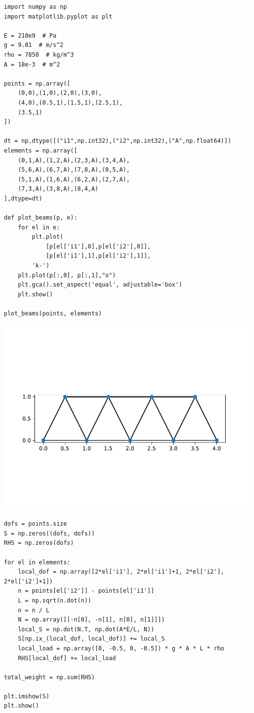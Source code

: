 \begin{verbatim}
import numpy as np
import matplotlib.pyplot as plt

E = 210e9  # Pa
g = 9.81  # m/s^2
rho = 7850  # kg/m^3
A = 18e-3  # m^2

points = np.array([
    (0,0),(1,0),(2,0),(3,0),
    (4,0),(0.5,1),(1.5,1),(2.5,1),
    (3.5,1)
])

dt = np.dtype([("i1",np.int32),("i2",np.int32),("A",np.float64)])
elements = np.array([
    (0,1,A),(1,2,A),(2,3,A),(3,4,A),
    (5,6,A),(6,7,A),(7,8,A),(0,5,A),
    (5,1,A),(1,6,A),(6,2,A),(2,7,A),
    (7,3,A),(3,8,A),(8,4,A)
],dtype=dt)

def plot_beams(p, e):
    for el in e:
        plt.plot(
            [p[el['i1'],0],p[el['i2'],0]],
            [p[el['i1'],1],p[el['i2'],1]],
        'k-')
    plt.plot(p[:,0], p[:,1],"o")
    plt.gca().set_aspect('equal', adjustable='box')
    plt.show()

plot_beams(points, elements)
\end{verbatim}

\includegraphics{truss_files/figure-latex/unnamed-chunk-1-1.pdf}

\begin{verbatim}
dofs = points.size
S = np.zeros((dofs, dofs))
RHS = np.zeros(dofs)

for el in elements:
    local_dof = np.array([2*el['i1'], 2*el['i1']+1, 2*el['i2'], 2*el['i2']+1])
    n = points[el['i2']] - points[el['i1']]
    L = np.sqrt(n.dot(n))
    n = n / L
    N = np.array([[-n[0], -n[1], n[0], n[1]]])
    local_S = np.dot(N.T, np.dot(A*E/L, N))
    S[np.ix_(local_dof, local_dof)] += local_S
    local_load = np.array([0, -0.5, 0, -0.5]) * g * A * L * rho
    RHS[local_dof] += local_load

total_weight = np.sum(RHS)

plt.imshow(S)
plt.show()
\end{verbatim}

